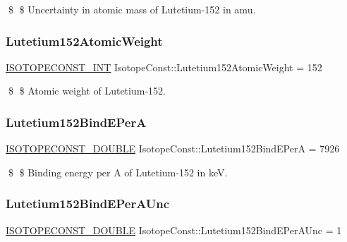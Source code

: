 \$ \$ Uncertainty in atomic mass of Lutetium-\/152 in amu. \mbox{\label{group___isotope_const-_lutetium-_lu152_ga5b1ee1e76420dda66855d5e8ab79ae30}} 
\subsubsection{\texorpdfstring{Lutetium152\+Atomic\+Weight}{Lutetium152AtomicWeight}}
{\footnotesize\ttfamily \mbox{\hyperlink{group___isotope_const-_macros_ga5f18360b3e99483a35c32d789e62621c}{I\+S\+O\+T\+O\+P\+E\+C\+O\+N\+S\+T\+\_\+\+I\+NT}} Isotope\+Const\+::\+Lutetium152\+Atomic\+Weight = 152}

\$ \$ Atomic weight of Lutetium-\/152. \mbox{\label{group___isotope_const-_lutetium-_lu152_ga31a61c33c0862fafa583c42c82570324}} 
\subsubsection{\texorpdfstring{Lutetium152\+Bind\+E\+PerA}{Lutetium152BindEPerA}}
{\footnotesize\ttfamily \mbox{\hyperlink{group___isotope_const-_macros_ga8f45a7272ce02c0b4c65c44636ed719a}{I\+S\+O\+T\+O\+P\+E\+C\+O\+N\+S\+T\+\_\+\+D\+O\+U\+B\+LE}} Isotope\+Const\+::\+Lutetium152\+Bind\+E\+PerA = 7926}

\$ \$ Binding energy per A of Lutetium-\/152 in keV. \mbox{\label{group___isotope_const-_lutetium-_lu152_ga112ce9ce59d8ccf7a17ec5a50e45156a}} 
\subsubsection{\texorpdfstring{Lutetium152\+Bind\+E\+Per\+A\+Unc}{Lutetium152BindEPerAUnc}}
{\footnotesize\ttfamily \mbox{\hyperlink{group___isotope_const-_macros_ga8f45a7272ce02c0b4c65c44636ed719a}{I\+S\+O\+T\+O\+P\+E\+C\+O\+N\+S\+T\+\_\+\+D\+O\+U\+B\+LE}} Isotope\+Const\+::\+Lutetium152\+Bind\+E\+Per\+A\+Unc = 1}

